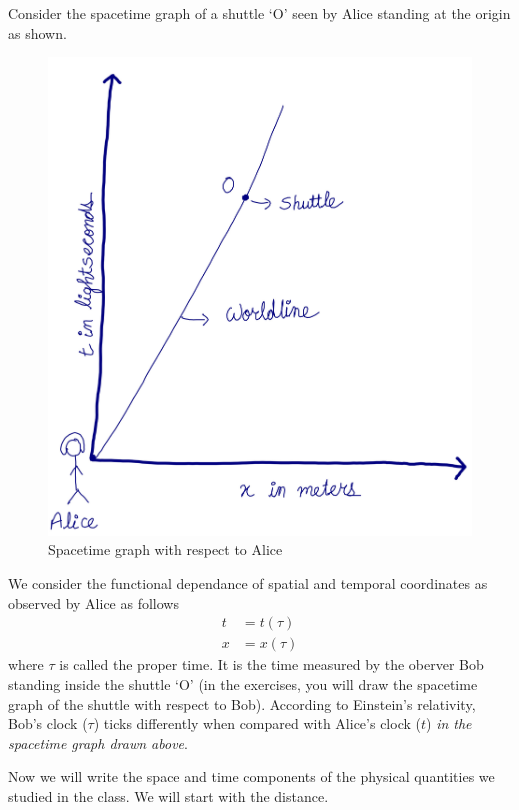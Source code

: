 \documentclass[10pt]{article}
\begin{document}
Consider the spacetime graph of a shuttle `O' seen by Alice standing at the origin as shown. 
\begin{figure}[h]
\label{springhooke}
\includegraphics[scale=.4]{alicespacetime}
\centering
\caption{Spacetime graph with respect to Alice}
\centering
\end{figure}
We consider the functional dependance of spatial and temporal coordinates as observed by Alice as follows
\begin{equation}
  \begin{split}
    t&=t(\tau)\\
    x&=x(\tau)
  \end{split}
\end{equation}
where $\tau$ is called the proper time.  It is the time measured by the oberver Bob standing inside the shuttle `O' (in the exercises, you will draw the spacetime graph of the shuttle with respect to Bob).  According to Einstein's relativity, Bob's clock ($\tau$) ticks differently when compared with Alice's clock ($t$) \emph{in the spacetime graph drawn above}.

Now we will write the space and time components of the physical quantities we studied in the class. We will start with the distance.
\end{document}
